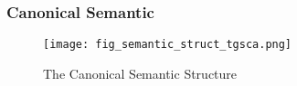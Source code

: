 \begin{frame}
    \frametitle{Canonical Semantic}
    \begin{figure}
        \texttt{[image: fig\_semantic\_struct\_tgsca.png]}
        \caption{The Canonical Semantic Structure}
    \end{figure}
\end{frame}

